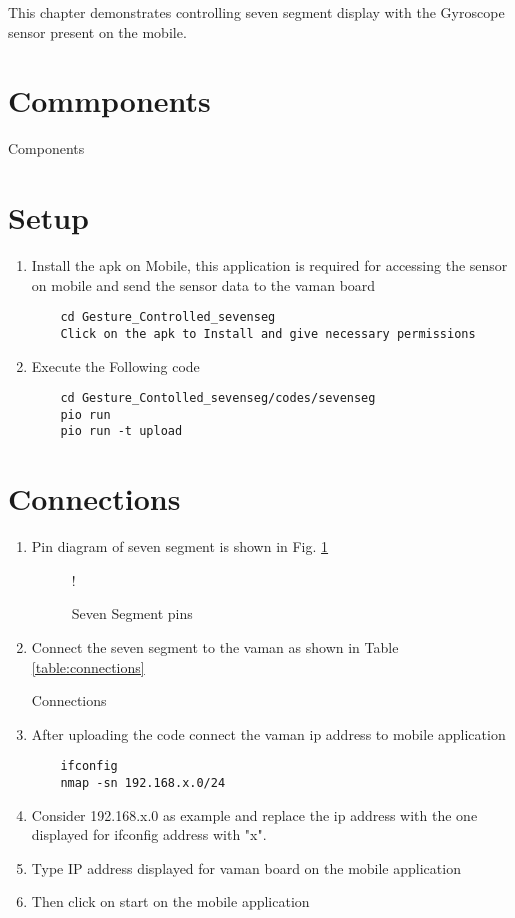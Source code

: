 This chapter demonstrates controlling seven segment display with the Gyroscope sensor present on the mobile. 

\section{Commponents}
\begin{table}[!ht]
	    \centering
	    
	    \caption{Components}
	\end{table}
\section{Setup}
\begin{enumerate}
    \item Install the apk on Mobile, this application is required for accessing the sensor on mobile and send the sensor data to the vaman board
    \begin{lstlisting}
    cd Gesture_Controlled_sevenseg
    Click on the apk to Install and give necessary permissions
    \end{lstlisting}
    \item Execute the Following code
    \begin{lstlisting}
    cd Gesture_Contolled_sevenseg/codes/sevenseg
    pio run
    pio run -t upload
    \end{lstlisting}
\end{enumerate}
\section{Connections}
\begin{enumerate}
    \item Pin diagram of seven segment is shown in Fig. \ref{fig:sevenseg}
    	\begin{figure}[!ht]
		\begin{center}
		\resizebox {0.5\columnwidth} {!} {
		}
		\end{center}
		\caption{Seven Segment pins}
		\label{fig:sevenseg}
	\end{figure}
    \item Connect the seven segment to the vaman as shown in Table \ref{table:connections}
    	\begin{table}[!ht]
	    \centering
	    
	    \caption{Connections}
	    \label{table:connections}
	\end{table}
    \item After uploading the code connect the vaman ip address to mobile application
    \begin{lstlisting}
    ifconfig
    nmap -sn 192.168.x.0/24
    \end{lstlisting}
    \item Consider 192.168.x.0 as example and replace the ip address with the one displayed for ifconfig address with "x".
    \item Type IP address displayed for vaman board on the mobile application
    \item Then click on start on the mobile application
\end{enumerate}
